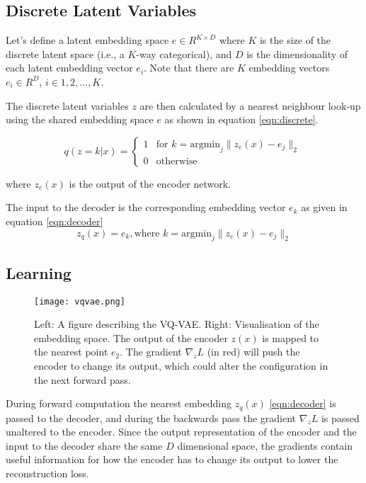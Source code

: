 \subsection{Discrete Latent Variables}

Let's define a latent embedding space $e \in R^{K \times D}$ where $K$ is the size of the discrete latent space 
(i.e., a $K$-way categorical), and $D$ is the dimensionality of each latent embedding vector $e_{i}$.
Note that there are $K$ embedding vectors $e_{i} \in R ^D$, $i\in{1, 2, ..., K}$.

The discrete latent variables $z$ are then calculated by a nearest 
neighbour look-up using the shared embedding space $e$ as shown in equation \ref{eqn:discrete}.

\begin{equation}
q(z = k|x) =
\begin{cases}
    1 & \text{for } k = \text{argmin}_{j} \| z_{e}(x) - e_{j} \|_{2} \\
    0 & \text{otherwise}
\end{cases}
\label{eqn:discrete}
\end{equation} 

where $z _e(x)$ is the output of the encoder network.

The input to the decoder is the corresponding embedding vector $e _k$ as given in equation \ref{eqn:decoder}
\begin{equation}
    z _q(x) = e _k, \text{where } k= \text{argmin} _j \| z _e(x) - e _j \| _2
    \label{eqn:decoder}
\end{equation}

\subsection{Learning}

\begin{figure}[h]
    \begin{center}
        \texttt{[image: vqvae.png]}
    \end{center}
    \caption{Left: A figure describing the VQ-VAE. Right: Visualisation of the embedding space. The
    output of the encoder $z(x)$ is mapped to the nearest point $e _2$. The gradient $\nabla _z L$ (in red) will push the
    encoder to change its output, which could alter the configuration in the next forward pass.~\cite{razavi2019generating}}
    \label{fig:vqvae}
\end{figure}

During forward computation the nearest embedding $z _q(x)$ \ref{eqn:decoder} is passed to the decoder,
and during the backwards pass the gradient $\nabla _z L$ is passed unaltered to the encoder. 
Since the output representation of the encoder and the input to the decoder share the same $D$
dimensional space, the gradients contain useful information for how the encoder has to change its 
output to lower the reconstruction loss.

